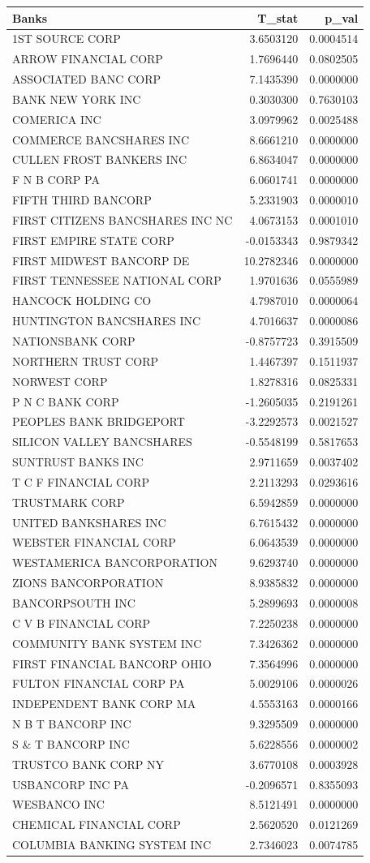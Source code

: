 \documentclass[11pt,]{article}
\begin{document}
\begin{longtable}[]{@{}lrr@{}}
\toprule
Banks & T\_stat & p\_val\tabularnewline
\midrule
\endhead
1ST SOURCE CORP & 3.6503120 & 0.0004514\tabularnewline
ARROW FINANCIAL CORP & 1.7696440 & 0.0802505\tabularnewline
ASSOCIATED BANC CORP & 7.1435390 & 0.0000000\tabularnewline
BANK NEW YORK INC & 0.3030300 & 0.7630103\tabularnewline
COMERICA INC & 3.0979962 & 0.0025488\tabularnewline
COMMERCE BANCSHARES INC & 8.6661210 & 0.0000000\tabularnewline
CULLEN FROST BANKERS INC & 6.8634047 & 0.0000000\tabularnewline
F N B CORP PA & 6.0601741 & 0.0000000\tabularnewline
FIFTH THIRD BANCORP & 5.2331903 & 0.0000010\tabularnewline
FIRST CITIZENS BANCSHARES INC NC & 4.0673153 & 0.0001010\tabularnewline
FIRST EMPIRE STATE CORP & -0.0153343 & 0.9879342\tabularnewline
FIRST MIDWEST BANCORP DE & 10.2782346 & 0.0000000\tabularnewline
FIRST TENNESSEE NATIONAL CORP & 1.9701636 & 0.0555989\tabularnewline
HANCOCK HOLDING CO & 4.7987010 & 0.0000064\tabularnewline
HUNTINGTON BANCSHARES INC & 4.7016637 & 0.0000086\tabularnewline
NATIONSBANK CORP & -0.8757723 & 0.3915509\tabularnewline
NORTHERN TRUST CORP & 1.4467397 & 0.1511937\tabularnewline
NORWEST CORP & 1.8278316 & 0.0825331\tabularnewline
P N C BANK CORP & -1.2605035 & 0.2191261\tabularnewline
PEOPLES BANK BRIDGEPORT & -3.2292573 & 0.0021527\tabularnewline
SILICON VALLEY BANCSHARES & -0.5548199 & 0.5817653\tabularnewline
SUNTRUST BANKS INC & 2.9711659 & 0.0037402\tabularnewline
T C F FINANCIAL CORP & 2.2113293 & 0.0293616\tabularnewline
TRUSTMARK CORP & 6.5942859 & 0.0000000\tabularnewline
UNITED BANKSHARES INC & 6.7615432 & 0.0000000\tabularnewline
WEBSTER FINANCIAL CORP & 6.0643539 & 0.0000000\tabularnewline
WESTAMERICA BANCORPORATION & 9.6293740 & 0.0000000\tabularnewline
ZIONS BANCORPORATION & 8.9385832 & 0.0000000\tabularnewline
BANCORPSOUTH INC & 5.2899693 & 0.0000008\tabularnewline
C V B FINANCIAL CORP & 7.2250238 & 0.0000000\tabularnewline
COMMUNITY BANK SYSTEM INC & 7.3426362 & 0.0000000\tabularnewline
FIRST FINANCIAL BANCORP OHIO & 7.3564996 & 0.0000000\tabularnewline
FULTON FINANCIAL CORP PA & 5.0029106 & 0.0000026\tabularnewline
INDEPENDENT BANK CORP MA & 4.5553163 & 0.0000166\tabularnewline
N B T BANCORP INC & 9.3295509 & 0.0000000\tabularnewline
S \& T BANCORP INC & 5.6228556 & 0.0000002\tabularnewline
TRUSTCO BANK CORP NY & 3.6770108 & 0.0003928\tabularnewline
USBANCORP INC PA & -0.2096571 & 0.8355093\tabularnewline
WESBANCO INC & 8.5121491 & 0.0000000\tabularnewline
CHEMICAL FINANCIAL CORP & 2.5620520 & 0.0121269\tabularnewline
COLUMBIA BANKING SYSTEM INC & 2.7346023 & 0.0074785\tabularnewline

\end{longtable}
\end{document}
